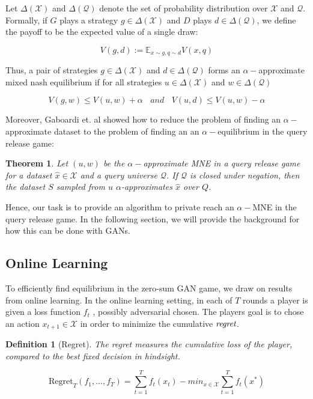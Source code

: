 \documentclass[]{article}
\newcommand{\X}{\mathcal{X}}
\newcommand{\Q}{\mathcal{Q}}
\newtheorem{definition}{Definition}[section]
\newtheorem{theorem}{Theorem}[section]
\theoremstyle{definition}
\begin{document}
Let $\Delta(\X)$ and $\Delta(\Q)$ denote the set of probability distribution over $\X$ and $\Q$. Formally, if $G$ plays a strategy $g \in \Delta(\X)$ and $D$ plays  $d \in \Delta(\Q)$, we define the payoff to be the expected value of a single draw:

\begin{equation}
    V(g,d) := \mathbb{E}_{x \sim g, q \sim d} V(x,q)
\end{equation}

Thus, a pair of strategies $g \in \Delta(\X)$ and $d \in \Delta(\Q)$ forms an $\alpha-$approximate mixed nash equilibrium if for all strategies $u \in \Delta(\X)$ and $w \in \Delta(\Q)$

\begin{equation}
    V(g, w) \leq V(u,w) + \alpha ~~~~ and ~~~~ V(u, d) \leq V(u,w) - \alpha 
\end{equation}

Moreover, Gaboardi et. al showed how to reduce the problem of finding an $\alpha-$approximate dataset to the problem of finding an an $\alpha-$equilibrium in the query release game:

\begin{theorem}
    Let $(u,w)$ be the $\alpha-$approximate MNE in a query release game for a dataset $\hat x \in \X$ and a query universe $\Q$. If $\Q$ is closed under negation, then the dataset $S$ sampled from $u$ $\alpha$-approximates $\hat x$ over $Q$. \cite{GAH+14}
\end{theorem}


Hence, our task is to provide an algorithm to private reach an $\alpha-$MNE in the query release game. In the following section, we will provide the background for how this can be done with GANs.

\subsection{Online Learning}

To efficiently find equilibrium in the zero-sum GAN game, we draw on results from online learning. In the online learning setting, in each of $T$ rounds a player is given a loss function $f_t$ , possibly adversarial chosen. The players goal is to chose an action $x_{t+1} \in \mathcal{X}$ in order to minimize the cumulative $\emph{regret}$. 

\begin{definition}[Regret]
    The regret measures the cumulative loss of the player, compared to the best fixed decision in hindsight. 

    \begin{equation}
        \text{Regret}_T(f_1,...,f_T) = \sum_{t=1}^T f_t(x_t) - min_{x \in \mathcal{X}} \sum_{t=1}^T f_t(x^*)
    \end{equation}
\end{definition}
\end{document}
